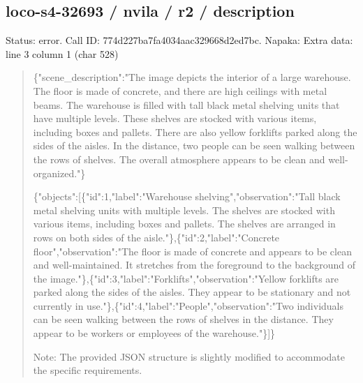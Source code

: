 \documentclass[10pt,a4paper]{article}
\begin{document}
\subsection*{loco-s4-32693 / nvila / r2 / description}
Status: error. Call ID: 774d227ba7fa4034aac329668d2ed7bc. Napaka: Extra data: line 3 column 1 (char 528)
\begin{quote}\footnotesize
\{"scene\_description":\allowbreak{}"The image depicts the interior of a large warehouse. The floor is made of concrete,\allowbreak{} and there are high ceilings with metal beams. The warehouse is filled with tall black metal shelving units that have multiple levels. These shelves are stocked with various items,\allowbreak{} including boxes and pallets. There are also yellow forklifts parked along the sides of the aisles. In the distance,\allowbreak{} two people can be seen walking between the rows of shelves. The overall atmosphere appears to be clean and well-organized."\}\par
\par
\{"objects":\allowbreak{}[\{"id":\allowbreak{}1,\allowbreak{}"label":\allowbreak{}"War\allowbreak{}ehouse shelving",\allowbreak{}"observation":\allowbreak{}"Tall black metal shelving units with multiple levels. The shelves are stocked with various items,\allowbreak{} including boxes and pallets. The shelves are arranged in rows on both sides of the aisle."\},\allowbreak{}\{"id":\allowbreak{}2,\allowbreak{}"label":\allowbreak{}"Concre\allowbreak{}te floor",\allowbreak{}"observation":\allowbreak{}"The floor is made of concrete and appears to be clean and well-maintained. It stretches from the foreground to the background of the image."\},\allowbreak{}\{"id":\allowbreak{}3,\allowbreak{}"label":\allowbreak{}"Forkli\allowbreak{}fts",\allowbreak{}"observation":\allowbreak{}"Yellow forklifts are parked along the sides of the aisles. They appear to be stationary and not currently in use."\},\allowbreak{}\{"id":\allowbreak{}4,\allowbreak{}"label":\allowbreak{}"People",\allowbreak{}\allowbreak{}"observation":\allowbreak{}"Two individuals can be seen walking between the rows of shelves in the distance. They appear to be workers or employees of the warehouse."\}]\}\par
\par
Note:\allowbreak{} The provided JSON structure is slightly modified to accommodate the specific requirements.
\end{quote}
\end{document}
